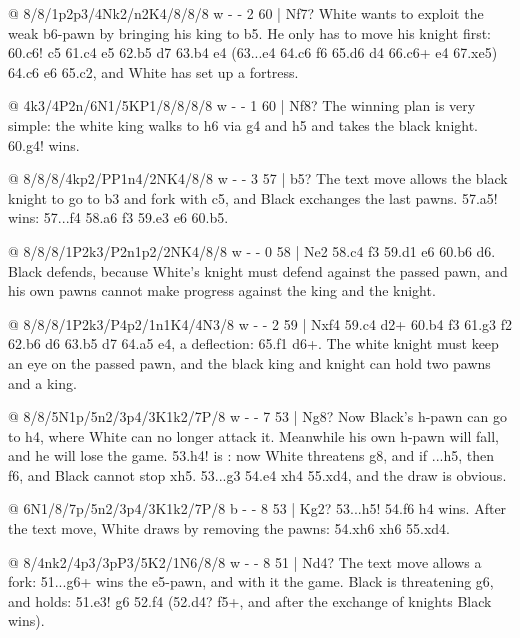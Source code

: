 @ 8/8/1p2p3/4Nk2/n2K4/8/8/8 w - - 2 60 | Nf7?
White wants to exploit the weak b6-pawn by bringing his king to b5. He only has to move his knight
first: 60.\N c6! \N c5 61.\K c4 e5 62.\K b5 \N d7 63.\N b4 e4 (63...\K e4 64.\K c6 \N f6 65.\K d6
\K d4 66.\N c6+ \K e4 67.\N xe5) 64.\K c6 \K e6 65.\N c2, and White has set up a
fortress.

@ 4k3/4P2n/6N1/5KP1/8/8/8/8 w - - 1 60 | Nf8?
The winning plan is very simple: the white king walks to h6
via g4 and h5 and takes the black knight. 60.\K g4! wins.

@ 8/8/8/4kp2/PP1n4/2NK4/8/8 w - - 3 57 | b5?
The text move allows the black knight to go to b3 and fork with \N c5, and Black
exchanges the last pawns. 57.a5! wins:
57...f4 58.a6 f3 59.\K e3 \N e6 60.\N b5.

@ 8/8/8/1P2k3/P2n1p2/2NK4/8/8 w - - 0 58 | Ne2
58.\K c4 f3 59.\N d1 \N e6 60.b6 \K d6. Black defends, because White's knight must defend
against the passed pawn, and his own pawns cannot make progress against the king and the knight.

@ 8/8/8/1P2k3/P4p2/1n1K4/4N3/8 w - - 2 59 | Nxf4
59.\K c4 \N d2+ 60.\K b4 f3 61.\N g3 f2 62.b6 \K d6 63.\K b5 \K d7 64.a5 \N e4,
a deflection: 65.\N f1 \N d6+. The white knight must keep an eye on
the passed pawn, and the black king and knight can hold two pawns and a king.

@ 8/8/5N1p/5n2/3p4/3K1k2/7P/8 w - - 7 53 | Ng8?
Now Black's h-pawn can go to h4, where White can no longer attack it. Meanwhile his own h-pawn will
fall, and he will lose the game. 53.h4! is : now White
threatens \N g8, and if ...h5, then \N f6, and Black cannot stop \N xh5.
53...\K g3 54.\K e4 \N xh4 55.\K xd4, and the draw is obvious.

@ 6N1/8/7p/5n2/3p4/3K1k2/7P/8 b - - 8 53 | Kg2?
53...h5! 54.\N f6 h4 wins. After the text move, White draws by removing the pawns: 54.\N xh6
\N xh6 55.\K xd4.

@ 8/4nk2/4p3/3pP3/5K2/1N6/8/8 w - - 8 51 | Nd4?
The text move allows a fork: 51...\N g6+ wins the e5-pawn, and with it the game.
Black is threatening \N g6, and  holds: 51.\K e3!
\K g6 52.\K f4 (52.\N d4? \N f5+, and after the exchange of knights Black wins).

